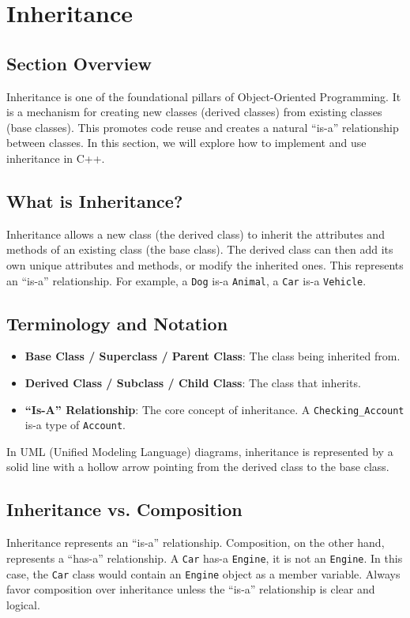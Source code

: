 \section{Inheritance}

\subsection{Section Overview}
Inheritance is one of the foundational pillars of Object-Oriented Programming. It is a mechanism for creating new classes (derived classes) from existing classes (base classes). This promotes code reuse and creates a natural ``is-a'' relationship between classes. In this section, we will explore how to implement and use inheritance in C++.

\subsection{What is Inheritance?}
Inheritance allows a new class (the derived class) to inherit the attributes and methods of an existing class (the base class). The derived class can then add its own unique attributes and methods, or modify the inherited ones. This represents an ``is-a'' relationship. For example, a \texttt{Dog} is-a \texttt{Animal}, a \texttt{Car} is-a \texttt{Vehicle}.

\subsection{Terminology and Notation}
\begin{itemize}
	\item \textbf{Base Class / Superclass / Parent Class}: The class being inherited from.
	\item \textbf{Derived Class / Subclass / Child Class}: The class that inherits.
	\item \textbf{``Is-A'' Relationship}: The core concept of inheritance. A \texttt{Checking\_Account} is-a type of \texttt{Account}.
\end{itemize}
In UML (Unified Modeling Language) diagrams, inheritance is represented by a solid line with a hollow arrow pointing from the derived class to the base class.

\subsection{Inheritance vs. Composition}
Inheritance represents an ``is-a'' relationship. Composition, on the other hand, represents a ``has-a'' relationship. A \texttt{Car} has-a \texttt{Engine}, it is not an \texttt{Engine}. In this case, the \texttt{Car} class would contain an \texttt{Engine} object as a member variable. Always favor composition over inheritance unless the ``is-a'' relationship is clear and logical.

